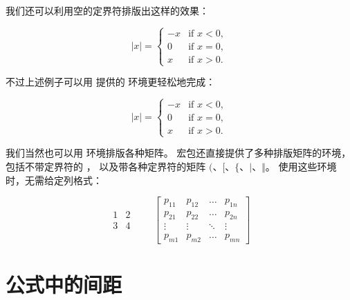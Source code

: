 我们还可以利用空的定界符排版出这样的效果：
\begin{example}
\[
|x| = \left\{
\begin{array}{rl}
-x & \text{if } x < 0,\\
0 & \text{if } x = 0,\\
x & \text{if } x > 0.
\end{array} \right.
\]
\end{example}

不过上述例子可以用  提供的  环境更轻松地完成：
\begin{example}
\[
|x| =
\begin{cases}
-x & \text{if } x < 0,\\
0 & \text{if } x = 0,\\
x & \text{if } x > 0.
\end{cases}
\]
\end{example}

我们当然也可以用  环境排版各种矩阵。 宏包还直接提供了多种排版矩阵的环境，包括不带定界符的 ，
以及带各种定界符的矩阵 $($、$[$、$\{$、$\vert$、$\Vert$。
使用这些环境时，无需给定列格式：
\begin{example}
\[
\begin{matrix}
1 & 2 \\
3 & 4
\end{matrix} \qquad
\begin{bmatrix}
p_{11} & p_{12} & \ldots & p_{1n} \\
p_{21} & p_{22} & \ldots & p_{2n} \\
\vdots & \vdots & \ddots & \vdots \\
p_{m1} & p_{m2} & \ldots & p_{mn}
\end{bmatrix}
\]
\end{example}

\section{公式中的间距}\label{sec:math-space}

